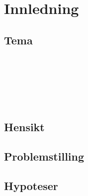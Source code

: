 \section{Innledning}

\subsection{Tema}

\lipsum[1-4]

\parencite{datatilsynet_personvern}\\
\parencite{regjeringen_personvern}\\
\parencite{regjeringen_gdpr}\\
\parencite{regjeringen_nylov}\\
\parencite{test}\\

\subsection{Hensikt}

\subsection{Problemstilling}

\subsection{Hypoteser}

\newpage